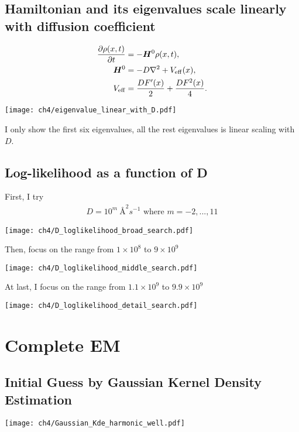 \subsection{Hamiltonian and its eigenvalues scale linearly with diffusion coefficient}
\begin{align*}
    \frac{\partial \rho(x,t)}{\partial t} &= -\bm{H}^0 \rho(x,t), \\
    \bm{H}^0 &= -D\nabla^2  + V_{\rm eff}(x), \\
    V_{\rm eff}  &= \frac{DF'(x)}{2} + \frac{DF^2(x)}{4}.
\end{align*}
\begin{center}
    \texttt{[image: ch4/eigenvalue\_linear\_with\_D.pdf]}   
\end{center}
I only show the first six eigenvalues, all the rest eigenvalues is linear scaling with $D$.

\subsection{Log-likelihood as a function of D}
First, I try 
\begin{align*}
    D = 10^{m}~\si{\angstrom}^{2}s^{-1}\text{   where } m=-2,...,11
\end{align*}
\begin{center}
    \texttt{[image: ch4/D\_loglikelihood\_broad\_search.pdf]} 
\end{center}
Then, focus on the range from $1 \times 10^{8}$ to $9 \times 10^{9}$
\begin{center}
    \texttt{[image: ch4/D\_loglikelihood\_middle\_search.pdf]}   
\end{center}
At last, I focus on the range from $1.1 \times 10^{9}$ to $9.9 \times 10^{9}$
\begin{center}
    \texttt{[image: ch4/D\_loglikelihood\_detail\_search.pdf]}   
\end{center}

\section{Complete EM}
\subsection{Initial Guess by Gaussian Kernel Density Estimation}
\begin{center}
    \texttt{[image: ch4/Gaussian\_Kde\_harmonic\_well.pdf]} 
\end{center}

